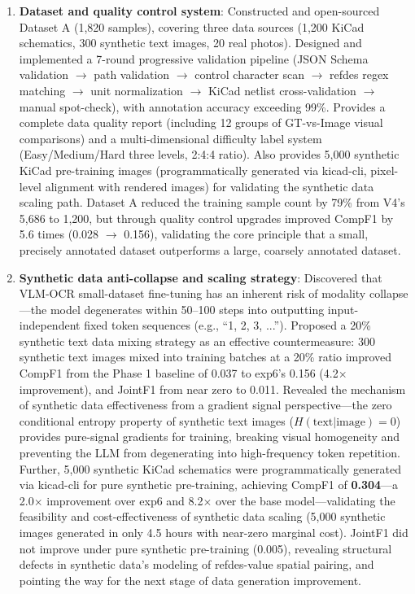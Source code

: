 \begin{enumerate}
    \item \textbf{Dataset and quality control system}: Constructed and open-sourced Dataset A (1,820 samples), covering three data sources (1,200 KiCad schematics, 300 synthetic text images, 20 real photos). Designed and implemented a 7-round progressive validation pipeline (JSON Schema validation $\to$ path validation $\to$ control character scan $\to$ refdes regex matching $\to$ unit normalization $\to$ KiCad netlist cross-validation $\to$ manual spot-check), with annotation accuracy exceeding 99\%. Provides a complete data quality report (including 12 groups of GT-vs-Image visual comparisons) and a multi-dimensional difficulty label system (Easy/Medium/Hard three levels, 2:4:4 ratio). Also provides 5,000 synthetic KiCad pre-training images (programmatically generated via kicad-cli, pixel-level alignment with rendered images) for validating the synthetic data scaling path. Dataset A reduced the training sample count by 79\% from V4's 5,686 to 1,200, but through quality control upgrades improved CompF1 by 5.6 times (0.028 $\to$ 0.156), validating the core principle that a small, precisely annotated dataset outperforms a large, coarsely annotated dataset.

    \item \textbf{Synthetic data anti-collapse and scaling strategy}: Discovered that VLM-OCR small-dataset fine-tuning has an inherent risk of modality collapse---the model degenerates within 50--100 steps into outputting input-independent fixed token sequences (e.g., ``1, 2, 3, ...''). Proposed a 20\% synthetic text data mixing strategy as an effective countermeasure: 300 synthetic text images mixed into training batches at a 20\% ratio improved CompF1 from the Phase 1 baseline of 0.037 to exp6's 0.156 (4.2$\times$ improvement), and JointF1 from near zero to 0.011. Revealed the mechanism of synthetic data effectiveness from a gradient signal perspective---the zero conditional entropy property of synthetic text images ($H(\text{text}|\text{image}) = 0$) provides pure-signal gradients for training, breaking visual homogeneity and preventing the LLM from degenerating into high-frequency token repetition. Further, 5,000 synthetic KiCad schematics were programmatically generated via kicad-cli for pure synthetic pre-training, achieving CompF1 of \textbf{0.304}---a 2.0$\times$ improvement over exp6 and 8.2$\times$ over the base model---validating the feasibility and cost-effectiveness of synthetic data scaling (5,000 synthetic images generated in only 4.5 hours with near-zero marginal cost). JointF1 did not improve under pure synthetic pre-training (0.005), revealing structural defects in synthetic data's modeling of refdes-value spatial pairing, and pointing the way for the next stage of data generation improvement.


\end{enumerate}
